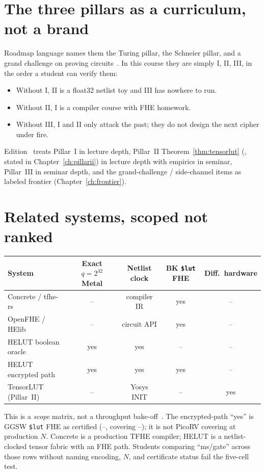 \section{The three pillars as a curriculum, not a brand}

Roadmap language names them the Turing pillar, the Schneier pillar, and a
grand challenge on proving circuits~\cite{helut-trajectory}.
In this course they are simply I, II, III, in the order a student can
verify them:

\begin{itemize}
  \item Without I, II is a float32 netlist toy and III has nowhere to run.
  \item Without II, I is a compiler course with FHE homework.
  \item Without III, I and II only attack the past; they do not design the
        next cipher under fire.
\end{itemize}

Edition~\corpusedition{} treats Pillar~I in lecture depth, Pillar~II
Theorem~\ref{thm:tensorlut} (, stated in Chapter~\ref{ch:pillarii}) in
lecture depth with empirics in seminar, Pillar~III in seminar depth, and the grand-challenge / side-channel
items as labeled frontier (Chapter~\ref{ch:frontier}).

\section{Related systems, scoped not ranked}

\begin{center}
\begin{tabular}{@{}lcccc@{}}
\toprule
System & Exact $q{=}2^{32}$ Metal & Netlist clock & BK \texttt{\$lut} FHE & Diff.\ hardware \\
\midrule
Concrete / tfhe-rs & -- & compiler IR & yes & -- \\
OpenFHE / HElib & -- & circuit API & yes & -- \\
HELUT boolean oracle & yes & yes & -- & -- \\
HELUT encrypted path & yes & yes & yes & -- \\
TensorLUT (Pillar~II) & -- & Yosys INIT & -- & yes \\
\bottomrule
\end{tabular}
\end{center}

This is a \emph{scope} matrix, not a throughput bake-off~\cite{helut-paper}.
The encrypted-path ``yes'' is GGSW \texttt{\$lut} FHE as certified
(--, covering --); it is not PicoRV covering
at production $N$.
Concrete is a production TFHE compiler; HELUT is a netlist-clocked tensor
fabric with an FHE path.
Students comparing ``ms/gate'' across those rows without naming encoding,
$N$, and certificate status fail the five-cell test.

